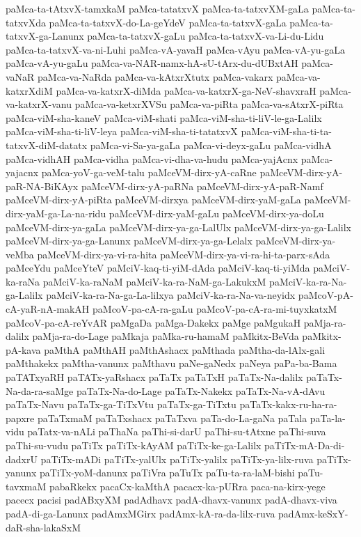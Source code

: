{paMca-ta-tAtxvX-tamxkaM
paMca-tatatxvX
paMca-ta-tatxvXM-gaLa
paMca-ta-tatxvXda
paMca-ta-tatxvX-do-La-geYdeV
paMca-ta-tatxvX-gaLa
paMca-ta-tatxvX-ga-Lanunx
paMca-ta-tatxvX-gaLu
paMca-ta-tatxvX-va-Li-du-Lidu
paMca-ta-tatxvX-va-ni-Luhi
paMca-vA-yavaH
paMca-vAyu
paMca-vA-yu-gaLa
paMca-vA-yu-gaLu
paMca-va-NAR-namx-hA-sU-tArx-du-dUBxtAH
paMca-vaNaR
paMca-va-NaRda
paMca-va-kAtxrXtutx
paMca-vakarx
paMca-va-katxrXdiM
paMca-va-katxrX-diMda
paMca-va-katxrX-ga-NeV-shavxraH
paMca-va-katxrX-vanu
paMca-va-ketxrXVSu
paMca-va-piRta
paMca-va-sAtxrX-piRta
paMca-viM-sha-kaneV
paMca-viM-shati
paMca-viM-sha-ti-liV-le-ga-Lalilx
paMca-viM-sha-ti-liV-leya
paMca-viM-sha-ti-tatatxvX
paMca-viM-sha-ti-ta-tatxvX-diM-datatx
paMca-vi-Sa-ya-gaLa
paMca-vi-deyx-gaLu
paMca-vidhA
paMca-vidhAH
paMca-vidha
paMca-vi-dha-va-hudu
paMca-yajAcnx
paMca-yajacnx
paMca-yoV-ga-veM-talu
paMceVM-dirx-yA-caRne
paMceVM-dirx-yA-paR-NA-BiKAyx
paMceVM-dirx-yA-paRNa
paMceVM-dirx-yA-paR-Namf
paMceVM-dirx-yA-piRta
paMceVM-dirxya
paMceVM-dirx-yaM-gaLa
paMceVM-dirx-yaM-ga-La-na-ridu
paMceVM-dirx-yaM-gaLu
paMceVM-dirx-ya-doLu
paMceVM-dirx-ya-gaLa
paMceVM-dirx-ya-ga-LalUlx
paMceVM-dirx-ya-ga-Lalilx
paMceVM-dirx-ya-ga-Lanunx
paMceVM-dirx-ya-ga-Lelalx
paMceVM-dirx-ya-veMba
paMceVM-dirx-ya-vi-ra-hita
paMceVM-dirx-ya-vi-ra-hi-ta-parx-sAda
paMceYdu
paMceYteV
paMciV-kaq-ti-yiM-dAda
paMciV-kaq-ti-yiMda
paMciV-ka-raNa
paMciV-ka-raNaM
paMciV-ka-ra-NaM-ga-LakukxM
paMciV-ka-ra-Na-ga-Lalilx
paMciV-ka-ra-Na-ga-La-lilxya
paMciV-ka-ra-Na-va-neyidx
paMcoV-pA-cA-yaR-nA-makAH
paMcoV-pa-cA-ra-gaLu
paMcoV-pa-cA-ra-mi-tuyxkatxM
paMcoV-pa-cA-reYvAR
paMgaDa
paMga-Dakekx
paMge
paMgukaH
paMja-ra-dalilx
paMja-ra-do-Lage
paMkaja
paMka-ru-hamaM
paMkitx-BeVda
paMkitx-pA-kava
paMthA
paMthAH
paMthAshacx
paMthada
paMtha-da-lAlx-gali
paMthakekx
paMtha-vanunx
paMthavu
paNe-gaNedx
paNeya
paPa-ba-Bama
paTATxyaRH
paTATx-yaRshacx
paTaTx
paTaTxH
paTaTx-Na-dalilx
paTaTx-Na-da-ra-saMge
paTaTx-Na-do-Lage
paTaTx-Nakekx
paTaTx-Na-vA-dAvu
paTaTx-Navu
paTaTx-ga-TiTxVtu
paTaTx-ga-TiTxtu
paTaTx-kakx-ru-ha-ra-papxre
paTaTxmaM
paTaTxshacx
paTaTxva
paTa-do-La-gaNa
paTala
paTa-la-vidu
paTatx-va-nALi
paThaNa
paThi-si-darU
paThi-su-tAtxne
paThi-suva
paThi-su-vudu
paTiTx
paTiTx-kAyAM
paTiTx-ke-ga-Lalilx
paTiTx-mA-Da-di-dadxrU
paTiTx-mADi
paTiTx-yalUlx
paTiTx-yalilx
paTiTx-ya-lilx-ruva
paTiTx-yanunx
paTiTx-yoM-danunx
paTiVra
paTuTx
paTu-ta-ra-laM-bishi
paTu-tavxmaM
pabaRkekx
pacaCx-kaMthA
pacacx-ka-pURra
paca-na-kirx-yege
pacecx
pacisi
padABxyXM
padAdhavx
padA-dhavx-vanunx
padA-dhavx-viva
padA-di-ga-Lanunx
padAmxMGirx
padAmx-kA-ra-da-lilx-ruva
padAmx-keSxY-daR-sha-lakaSxM
}
